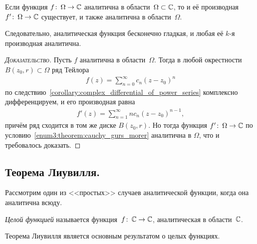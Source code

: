 \documentclass[../complex-analysis.tex]{subfiles}
\begin{document}
\begin{crly}
 Если функция $ f \colon\,\Omega\to\mathbb{C} $ аналитична в области~$ \Omega \subset \mathbb{C}$, то и её производная $ f' \colon\,\Omega\to\mathbb{C} $ существует, и также аналитична в области~$ \Omega $.

 Следовательно, аналитическая функция бесконечно гладкая, и любая её $ k $-я производная аналитична.
\end{crly}
\begin{proof}[\normalfont\textsc{Доказательство}]
 Пусть $ f $ аналитична в области~$ \Omega $. Тогда в любой окрестности~$ B(z_0, r) \subset \Omega $ ряд Тейлора
 \begin{align*}
  f(z) = \sum_{n=0}^{\infty} c_n (z-z_0)^{n}
 \end{align*} по следствию~\ref{corollary:complex_differential_of_power_series} комплексно дифференцируем, и его производная равна
 \begin{align*}
  f'(z) = \sum_{n=1}^{\infty} nc_n (z-z_0)^{n-1},
 \end{align*} причём ряд сходится в том же диске $ B(z_0,r) $. Но тогда функция $ f' \colon\,\Omega\to\mathbb{C} $ по условию~\ref{enum3:theorem:cauchy_gurs_morer} аналитична в $ \Omega $, что и требовалось доказать.
\end{proof}

\subsection{Теорема Лиувилля.}

Рассмотрим один из <<простых>> случаев аналитической функции, когда она аналитична всюду.

\begin{df}
 \emph{Целой функцией} называется функция~$ f\colon\,\mathbb{C}\to\mathbb{C} $, аналитическая в области~$ \mathbb{C} $.
\end{df}

Теорема Лиувилля является основным результатом о целых функциях.
\end{document}
